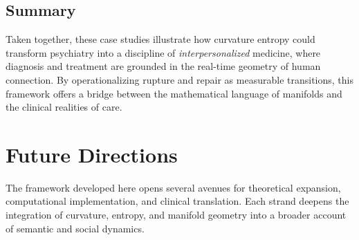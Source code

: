 \documentclass{article}
\theoremstyle{definition}
\begin{document}
\subsection{Summary}

Taken together, these case studies illustrate how curvature entropy could
transform psychiatry into a discipline of \emph{interpersonalized} medicine,
where diagnosis and treatment are grounded in the real-time geometry of human
connection. By operationalizing rupture and repair as measurable transitions,
this framework offers a bridge between the mathematical language of manifolds
and the clinical realities of care.


\section{Future Directions}

The framework developed here opens several avenues for theoretical expansion,
computational implementation, and clinical translation. Each strand deepens the
integration of curvature, entropy, and manifold geometry into a broader account
of semantic and social dynamics.
\end{document}
